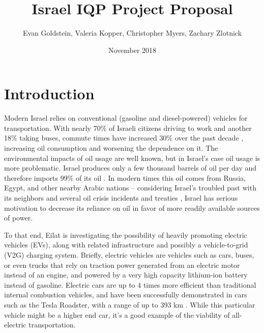 \documentclass{report}                         %
\title{Israel IQP Project Proposal}
\author{Evan Goldstein, Valeria Kopper, Christopher Myers, Zachary Zlotnick}
\date{November 2018}
\begin{document}
\maketitle

\renewcommand\abstractname{Summary} %

\tableofcontents
\newpage
{}

\doublespacing

\chapter{Introduction}

Modern Israel relies on conventional (gasoline and diesel-powered) vehicles for transportation. With nearly 70\% of Israeli citizens driving to work and another 18\% taking buses, commute times have increased 30\% over the past decade \cite{Dori2018IsraeliRoads}, increasing oil consumption and worsening the dependence on it. The environmental impacts of oil usage are well known, but in Israel's case oil usage is more problematic. Israel produces only a few thousand barrels of oil per day and therefore imports 99\% of its oil \cite{Engber2006WhereOil}. In modern times this oil comes from Russia, Egypt, and other nearby Arabic nations -- considering Israel's troubled past with its neighbors and several oil crisis incidents and treaties \cite{Engber2006WhereOil}, Israel has serious motivation to decrease its reliance on oil in favor of more readily available sources of power.

To that end, Eilat is investigating the possibility of heavily promoting electric vehicles (EVs), along with related infrastructure and possibly a vehicle-to-grid (V2G) charging system. Briefly, electric vehicles are vehicles such as cars, buses, or even trucks that rely on traction power generated from an electric motor instead of an engine, and powered by a very high capacity lithium-ion battery instead of gasoline. Electric cars are up to 4 times more efficient than traditional internal combustion vehicles, and have been successfully demonstrated in cars such as the Tesla Roadster, with a range of up to 393 km \cite{Friel2010ManagementVehicles}. While this particular vehicle might be a higher end car, it's a good example of the viability of all-electric transportation.
\end{document}
